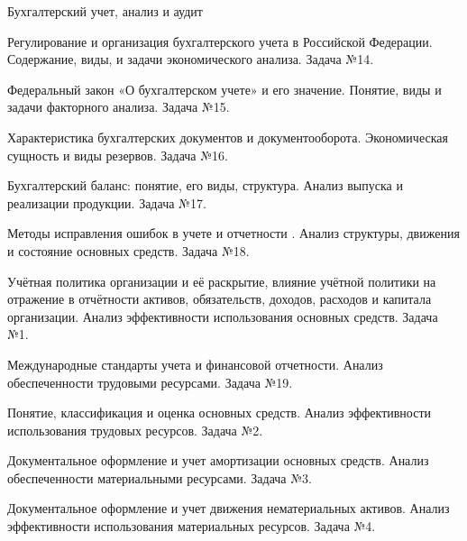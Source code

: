 \documentclass[
	11pt,
	a4paper,
	]
	{article}
\begin{document}
 {Бухгалтерский учет, анализ и аудит}

	

\noindent{} 
	{
		Регулирование и организация бухгалтерского учета в Российской Федерации.
	}{
		Содержание, виды, и задачи экономического анализа.
	}{
		Задача №14.
	}

\bigskip

\noindent{} 
	{
		Федеральный закон «О бухгалтерском учете» и его значение.
	}{
		Понятие, виды и задачи факторного анализа.
	}{
		Задача №15.
	}

\bigskip

\noindent{} 
	{
		Характеристика бухгалтерских документов и документооборота.
	}{
		Экономическая сущность и виды резервов.
	}{
		Задача №16.
	}

\bigskip

\noindent{} 
	{
		Бухгалтерский баланс: понятие, его виды, структура.
	}{
		Анализ выпуска и реализации продукции.
	}{
		Задача №17.
	}

\bigskip

\noindent{} 
	{
		Методы исправления ошибок в учете и отчетности .
	}{
		Анализ структуры, движения и состояние основных средств.
	}{
		Задача №18.
	}

\bigskip

\noindent{} 
	{
		Учётная политика организации и её раскрытие, влияние учётной политики на отражение в отчётности активов, обязательств, доходов, расходов и капитала организации.
	}{
		Анализ эффективности использования основных средств.
	}{
		Задача №1.
	}

\bigskip

\noindent{} 
	{
		Международные стандарты учета и финансовой отчетности.
	}{
		Анализ обеспеченности трудовыми ресурсами.
	}{
		Задача №19.
	}

\bigskip

\noindent{} 
	{
		Понятие, классификация и оценка основных средств.
	}{
		Анализ эффективности использования трудовых ресурсов.
	}{
		Задача №2.
	}

\bigskip

\noindent{} 
	{
		Документальное оформление и учет амортизации основных средств.
	}{
		Анализ обеспеченности материальными ресурсами.
	}{
		Задача №3.
	}

\bigskip

\noindent{} 
	{
		Документальное оформление и учет движения нематериальных активов.
	}{
		Анализ эффективности использования материальных ресурсов.
	}{
		Задача №4.
	}
\end{document}
